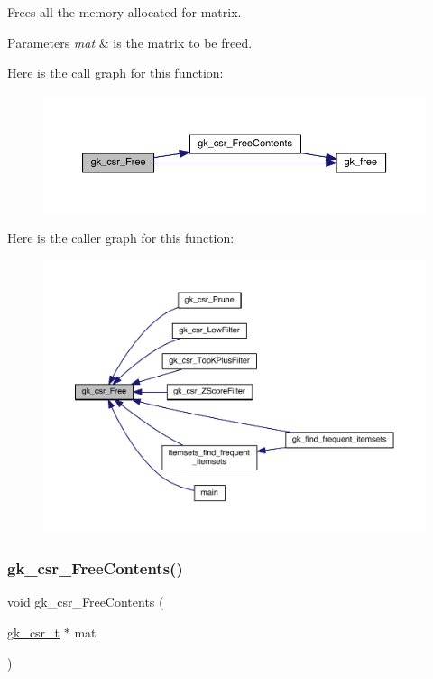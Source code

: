 Frees all the memory allocated for matrix. 
\begin{DoxyParams}{Parameters}
{\em mat} & is the matrix to be freed. \\
\hline
\end{DoxyParams}
Here is the call graph for this function\+:\nopagebreak
\begin{figure}[H]
\begin{center}
\leavevmode
\includegraphics[width=350pt]{a00077_ac3736361b8d6b391356f273c960c203b_cgraph}
\end{center}
\end{figure}
Here is the caller graph for this function\+:\nopagebreak
\begin{figure}[H]
\begin{center}
\leavevmode
\includegraphics[width=350pt]{a00077_ac3736361b8d6b391356f273c960c203b_icgraph}
\end{center}
\end{figure}
\mbox{\label{a00077_a9646f29b0605ba264bf373c441a6826d}} 
\subsubsection{\texorpdfstring{gk\+\_\+csr\+\_\+\+Free\+Contents()}{gk\_csr\_FreeContents()}}
{\footnotesize\ttfamily void gk\+\_\+csr\+\_\+\+Free\+Contents (\begin{DoxyParamCaption}\item[{\hyperlink{a00634}{gk\+\_\+csr\+\_\+t} $\ast$}]{mat }\end{DoxyParamCaption})}

